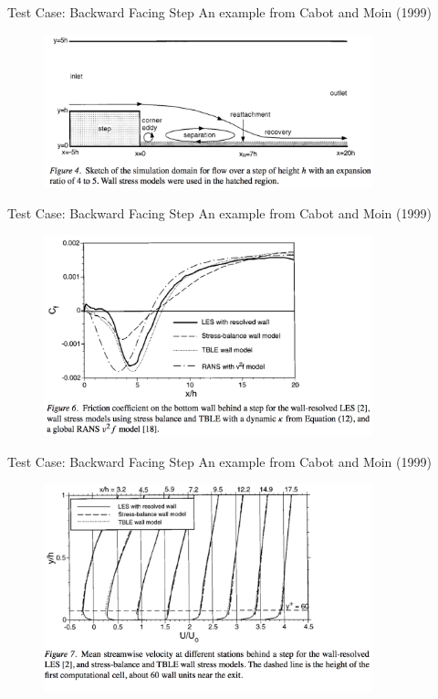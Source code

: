 \begin{frame}{Test Case: Backward Facing Step}
An example from Cabot and Moin (1999) 
\begin{figure}
\includegraphics[width=0.85\textwidth]{compare2}	
\end{figure}

\end{frame}

\begin{frame}{Test Case: Backward Facing Step}
An example from Cabot and Moin (1999) 
\begin{figure}
\includegraphics[width=0.85\textwidth]{compare3}	
\end{figure}
\end{frame}

\begin{frame}{Test Case: Backward Facing Step}
An example from Cabot and Moin (1999) 
\begin{figure}
\includegraphics[width=0.85\textwidth]{compare4}	
\end{figure}

\end{frame}

